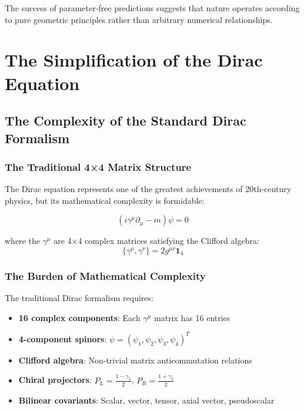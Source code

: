 \documentclass[12pt,a4paper]{report}
\begin{document}
The success of parameter-free predictions suggests that nature operates according to pure geometric principles rather than arbitrary numerical relationships.

\chapter{The Simplification of the Dirac Equation}
\label{chap:dirac_simplification}

\section{The Complexity of the Standard Dirac Formalism}
\label{sec:dirac_complexity}

\subsection{The Traditional 4×4 Matrix Structure}
\label{subsec:traditional_matrices}

The Dirac equation represents one of the greatest achievements of 20th-century physics, but its mathematical complexity is formidable:

\begin{equation}
	(i\gamma^\mu \partial_\mu - m)\psi = 0
	\label{eq:dirac_traditional}
\end{equation}

where the $\gamma^\mu$ are 4×4 complex matrices satisfying the Clifford algebra:
\begin{equation}
	\{\gamma^\mu, \gamma^\nu\} = 2g^{\mu\nu} \mathbf{1}_4
	\label{eq:clifford_algebra}
\end{equation}

\subsection{The Burden of Mathematical Complexity}
\label{subsec:mathematical_burden}

The traditional Dirac formalism requires:
\begin{itemize}
	\item \textbf{16 complex components}: Each $\gamma^\mu$ matrix has 16 entries
	\item \textbf{4-component spinors}: $\psi = (\psi_1, \psi_2, \psi_3, \psi_4)^T$
	\item \textbf{Clifford algebra}: Non-trivial matrix anticommutation relations
	\item \textbf{Chiral projectors}: $P_L = \frac{1-\gamma_5}{2}$, $P_R = \frac{1+\gamma_5}{2}$
	\item \textbf{Bilinear covariants}: Scalar, vector, tensor, axial vector, pseudoscalar
\end{itemize}
\end{document}
